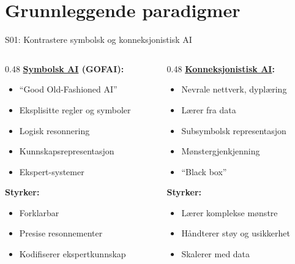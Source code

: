 \documentclass[aspectratio=169, 10pt]{beamer}
\begin{document}
\section{Grunnleggende paradigmer}

\begin{frame}{S01: Kontrastere symbolsk og konneksjonistisk AI}
    \begin{columns}[T]
        \begin{column}{0.48\textwidth}
            \textbf{\href{https://en.wikipedia.org/wiki/Symbolic_artificial_intelligence}{Symbolsk AI} (GOFAI):}
            \begin{itemize}
                \item ``Good Old-Fashioned AI''
                \item Eksplisitte regler og symboler
                \item Logisk resonnering
                \item Kunnskapsrepresentasjon
                \item Ekspert-systemer
            \end{itemize}
            
            \vspace{0.3cm}
            \textbf{Styrker:}
            \begin{itemize}
                \item Forklarbar
                \item Presise resonnementer
                \item Kodifiserer ekspertkunnskap
            \end{itemize}
        \end{column}
        \begin{column}{0.48\textwidth}
            \textbf{\href{https://en.wikipedia.org/wiki/Connectionism}{Konneksjonistisk AI}:}
            \begin{itemize}
                \item Nevrale nettverk, dyplæring
                \item Lærer fra data
                \item Subsymbolsk representasjon
                \item Mønstergjenkjenning
                \item ``Black box''
            \end{itemize}
            
            \vspace{0.3cm}
            \textbf{Styrker:}
            \begin{itemize}
                \item Lærer komplekse mønstre
                \item Håndterer støy og usikkerhet
                \item Skalerer med data
            \end{itemize}
        \end{column}
    \end{columns}
    

\end{frame}
\end{document}
